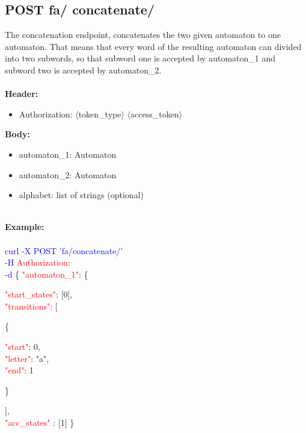 \subsection{POST fa/ concatenate/}
The concatenation endpoint, concatenates the two given automaton to one automaton. That means that every word of the resulting automaton can divided into two subwords, so that subword one is accepted by automaton\_1 and subword two is accepted by automaton\_2. \\
\ \\
\textbf{Header:}
\begin{itemize}
    \item Authorization: $\langle$token\_type$\rangle$ $\langle$access\_token$\rangle$
\end{itemize}
\textbf{Body:}
\ \\
\begin{itemize}
    \item automaton\_1: Automaton
     \item automaton\_2: Automaton
    \item alphabet: list of strings (optional)
\end{itemize}
\ \\
\textbf{Example:} \\
\ \\
\textcolor{blue}{curl -X POST '\BaseURL fa/concatenate/'\\
-H} \textcolor{red}{Authorization}: \Auth \\
\textcolor{blue}{-d} \{ 
     \textcolor{red}{"automaton\_1"}: \{
     \begin{adjustwidth}{7.5 mm}{0 cm}
     \begin{adjustwidth}{7.5 mm}{0 cm}
            \textcolor{red}{"start\_states"}: [0],\\
            \textcolor{red}{"transitions"}: [
            \begin{adjustwidth}{7.5 mm}{0 cm}
            \{
               \begin{adjustwidth}{7.5 mm}{0 cm}
                    \textcolor{red}{"start"}: 0,\\
                    \textcolor{red}{"letter"}: "a",\\
                    \textcolor{red}{"end"}: 1
               \end{adjustwidth}
            \}
            \end{adjustwidth}
            ],\\
        \textcolor{red}{"acc\_states" }: [1]  \}
    \end{adjustwidth}
    \end{adjustwidth}
